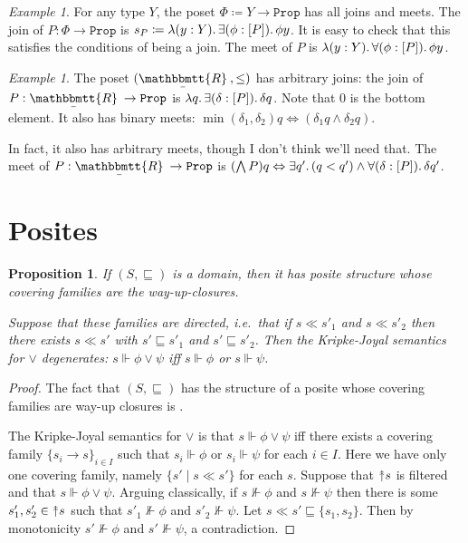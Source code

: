 \documentclass[11pt, oneside, article]{memoir}
\theoremstyle{plain}
\newtheorem{proposition}[theorem]{Proposition}
\theoremstyle{definition}
\theoremstyle{remark}
\newtheorem{example}[theorem]{Example}
\DeclarePairedDelimiter{\subtype}{[}{]}
\newcommand{\const}[1]{\mathtt{#1}}
\newcommand{\ubar}[1]{\underaccent{\bar}{#1}}
\newcommand{\internal}[1]{\raisebox{-.03ex}{$\mathbbmtt{#1}$}}
\newcommand{\hs}{\hspace{1.1pt}}
\newcommand{\tRR}{\internal{R}\hs}
\newcommand{\tLR}{\ubar{\tRR}\hs}
\newcommand{\Prop}{\const{Prop}}
\newcommand{\sqss}{\sqsubseteq}
\newcommand{\upclose}{{\rotatebox[origin=c]{90}{$\twoheadrightarrow$}}}
\renewcommand{\iff}{\Leftrightarrow}
\begin{document}
\begin{example}
For any type $Y$, the poset $\Phi\coloneqq Y\to\Prop$ has all joins and meets. The join of $P:\Phi\to\Prop$ is $s_P\coloneqq\lambda(y:Y)\ldotp\exists(\phi:\subtype{P})\ldotp\phi y$. It is easy to check that this satisfies the conditions of being a join. The meet of $P$ is $\lambda(y:Y)\ldotp\forall(\phi:\subtype{P})\ldotp\phi y$.
\end{example}

\begin{example}
The poset $(\tLR,\leq)$ has arbitrary joins: the join of $P:\tLR\to\Prop$ is $\lambda q\ldotp\exists(\delta:\subtype{P})\ldotp\delta q$. Note that $0$ is the bottom element. It also has binary meets: $\min(\delta_1,\delta_2)q\iff(\delta_1 q\wedge \delta_2q)$.

In fact, it also has arbitrary meets, though I don't think we'll need that. The meet of $P:\tLR\to\Prop$ is $(\bigwedge P)q\iff\exists q'\ldotp (q<q')\wedge\forall(\delta:\subtype{P})\ldotp\delta q'$.
\end{example}
\section{Posites}

\begin{proposition}
If $(S,\sqss)$ is a domain, then it has posite structure whose covering families are the way-up-closures.

Suppose that these families are directed, i.e.\ that if $s\ll s'_1$ and $s\ll s'_2$ then there exists $s\ll s'$ with $s'\sqss s'_1$ and $s'\sqss s'_2$. Then the Kripke-Joyal semantics for $\vee$ degenerates: $s\Vdash\phi\vee\psi$ iff $s\Vdash\phi$ or $s\Vdash\psi$.
\end{proposition}
\begin{proof}
The fact that $(S,\sqss)$ has the structure of a posite whose covering families are way-up closures is \cite[Remark 2.21]{Schultz.Spivak:2017a}.

The Kripke-Joyal semantics for $\vee$ is that $s\Vdash\phi\vee\psi$ iff there exists a covering family $\{s_i\to s\}_{i\in I}$ such that $s_i\Vdash\phi$ or $s_i\Vdash\psi$ for each $i\in I$. Here we have only one covering family, namely $\{s'\mid s\ll s'\}$ for each $s$. Suppose that $\upclose s$ is filtered and that $s\Vdash\phi\vee\psi$. Arguing classically, if $s\not\Vdash\phi$ and $s\not\Vdash\psi$ then there is some $s'_1,s'_2\in\upclose s$ such that $s'_1\not\Vdash\phi$ and $s'_2\not\Vdash\psi$. Let $s\ll s'\sqss \{s_1,s_2\}$. Then by monotonicity $s'\not\Vdash\phi$ and $s'\not\Vdash\psi$, a contradiction.
\end{proof}
\end{document}
